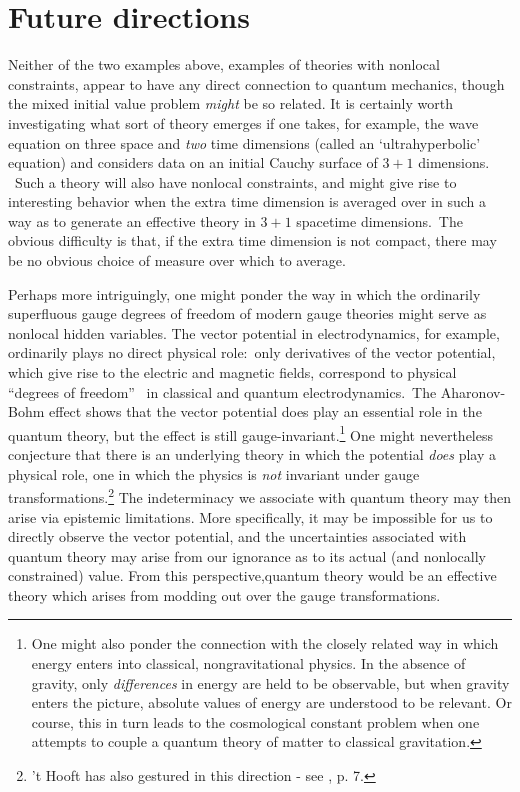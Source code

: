 \documentclass[12pt]{article}%
\begin{document}
\section{Future directions}

Neither of the two examples above, examples of theories with nonlocal
constraints, appear to have any direct connection to quantum mechanics, though
the mixed initial value problem \emph{might} be so related. It is certainly
worth investigating what sort of theory emerges if one takes, for example, the
wave equation on three space and \emph{two} time dimensions (called an
`ultrahyperbolic' equation) and considers data on an initial Cauchy surface of
$3+1$ dimensions. \ Such a theory will also have nonlocal constraints, and
might give rise to interesting behavior when the extra time dimension is
averaged over in such a way as to generate an effective theory in $3+1$
spacetime dimensions.\ The obvious difficulty is that, if the extra time
dimension is not compact, there may be no obvious choice of measure over which
to average.

Perhaps more intriguingly, one might ponder the way in which the ordinarily
superfluous gauge degrees of freedom of modern gauge theories might serve as
nonlocal hidden variables. The vector potential in electrodynamics, for
example, ordinarily plays no direct physical role:\ only derivatives of the
vector potential, which give rise to the electric and magnetic fields,
correspond to physical \textquotedblleft degrees of freedom\textquotedblright%
\ in classical and quantum electrodynamics.\ The Aharonov-Bohm effect shows
that the vector potential does play an essential role in the quantum theory,
but the effect is still gauge-invariant.\footnote{One might also ponder the
connection with the closely related way in which energy enters into classical,
nongravitational physics. In the absence of gravity, only \emph{differences}
in energy are held to be observable, but when gravity enters the picture,
absolute values of energy are understood to be relevant. Or course, this in
turn leads to the cosmological constant problem when one attempts to couple a
quantum theory of matter to classical gravitation.} One might nevertheless
conjecture that there is an underlying theory in which the potential
\emph{does} play a physical role, one in which the physics is \emph{not}
invariant under gauge transformations.\footnote{'t Hooft has also gestured in
this direction - see \cite{tHo07}, p. 7.} The indeterminacy we associate with
quantum theory may then arise via epistemic limitations. More specifically, it
may be impossible for us to directly observe the vector potential, and the
uncertainties associated with quantum theory may arise from our ignorance as
to its actual (and nonlocally constrained) value. From this
perspective,quantum theory would be an effective theory which arises from
modding out over the gauge transformations.
\end{document}
